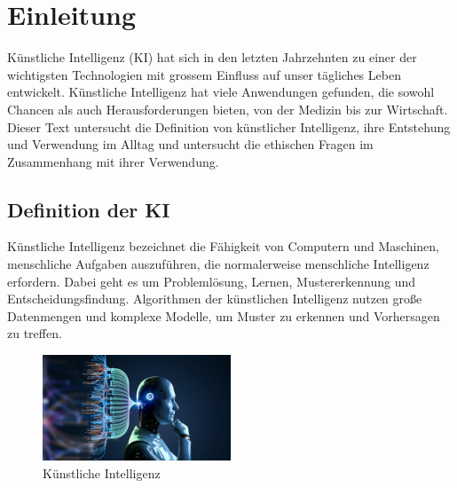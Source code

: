 \chapter{Einleitung}
Künstliche Intelligenz (KI) hat sich in den letzten Jahrzehnten zu einer der wichtigsten Technologien mit grossem Einfluss auf unser tägliches Leben entwickelt. Künstliche Intelligenz hat viele Anwendungen gefunden, die sowohl Chancen als auch Herausforderungen bieten, von der Medizin bis zur Wirtschaft. Dieser Text untersucht die Definition von künstlicher Intelligenz, ihre Entstehung und Verwendung im Alltag und untersucht die ethischen Fragen im Zusammenhang mit ihrer Verwendung.
\section{Definition der KI}
Künstliche Intelligenz bezeichnet die Fähigkeit von Computern und Maschinen, menschliche Aufgaben auszuführen, die normalerweise menschliche Intelligenz erfordern. Dabei geht es um Problemlösung, Lernen, Mustererkennung und Entscheidungsfindung. Algorithmen der künstlichen Intelligenz nutzen große Datenmengen und komplexe Modelle, um Muster zu erkennen und Vorhersagen zu treffen.
 
\begin{figure}[h]
    \centering
    \includegraphics[width=0.5\textwidth]{KI.jpg}
    \caption{Künstliche Intelligenz}
    \label{fig:ai1}
\end{figure}